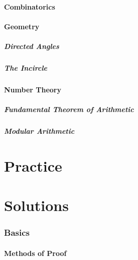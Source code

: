 \documentclass{amsart}
\begin{document}
\subsection{Combinatorics}
\subsection{Geometry}
\subsubsection{Directed Angles}\label{n:g:directed}
\subsubsection{The Incircle}\label{n:g:incircle}
\subsection{Number Theory}
\subsubsection{Fundamental Theorem of Arithmetic}\label{n:n:ftoa}
\subsubsection{Modular Arithmetic}
\newpage
\part{Practice}
\newpage
\part{Solutions}
\setcounter{section}{0}
\renewcommand*{\theHsection}{sols.\the\value{section}}
\section{Basics}
\subsection{Methods of Proof}
\end{document}
